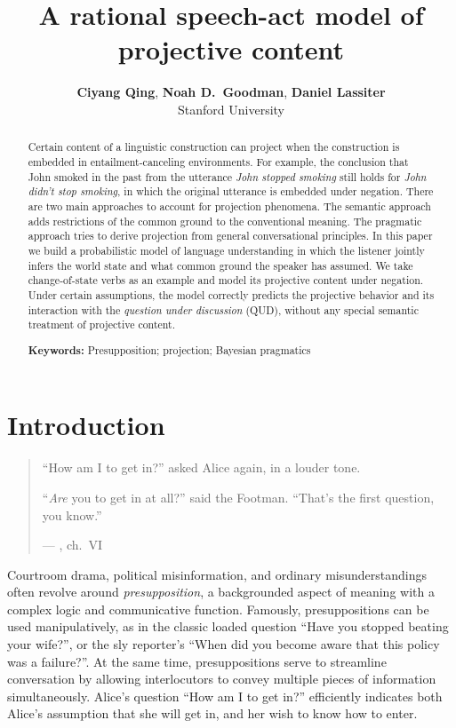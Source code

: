 \documentclass[10pt,letterpaper]{article}
\title{A rational speech-act model of projective content}
\author{{\large \bf Ciyang Qing}, {\large \bf Noah D.~Goodman}, {\large \bf Daniel Lassiter}\\
Stanford University}
\begin{document}
\maketitle
 
\begin{abstract}
Certain content of a linguistic construction can project when the construction is embedded in entailment-canceling environments.
 For example, the conclusion that John smoked in the past from the utterance \emph{John stopped smoking} 
 still holds for \emph{John didn't stop smoking}, in which the original utterance is 
 embedded under negation. 
 There are two main approaches to account for projection phenomena. 
 The semantic approach adds restrictions of the common ground to the conventional meaning.
 The pragmatic approach tries to derive projection from general conversational principles. 
 In this paper we build a probabilistic model of language understanding in which the listener 
  jointly infers the world state and what common ground the speaker has assumed. 
 We take change-of-state verbs as an example and model its projective content under negation. 
 Under certain assumptions, the model correctly predicts the projective behavior and its interaction with 
  the \emph{question under discussion} (QUD), without any special semantic treatment of projective content.

\textbf{Keywords:} 
Presupposition; projection; Bayesian pragmatics
\end{abstract}

\section{Introduction}
\label{sec:Intro}

\begin{quotation}
\noindent ``How am I to get in?'' asked Alice again, in a louder tone.

\noindent ``\emph{Are} you to get in at all?'' said the Footman. ``That's the first question, you know.'' 
\begin{flushright}
--- , ch.\ VI
\end{flushright}
\end{quotation}

Courtroom drama, political misinformation, and ordinary misunderstandings often revolve around \emph{presupposition}, a backgrounded aspect of meaning with a complex logic and communicative function. Famously, presuppositions can be used manipulatively, as in the classic loaded question ``Have you stopped beating your wife?'', or the sly reporter's ``When did you become aware that this policy was a failure?''. At the same time, presuppositions serve to streamline conversation by allowing interlocutors to convey multiple pieces of information simultaneously. Alice's question ``How am I to get in?'' efficiently indicates both Alice's assumption that she will get in, and her wish to know how to enter.
\end{document}
